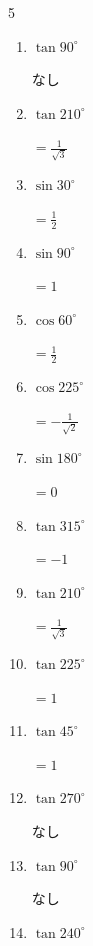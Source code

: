 \begin{multicols}{5}
\begin{enumerate}
  \item $\displaystyle \tan{90^\circ}$

        $\displaystyle なし$

  \item $\displaystyle \tan{210^\circ}$

        $\displaystyle =\frac{1}{\sqrt{3}}$

  \item $\displaystyle \sin{30^\circ}$

        $\displaystyle =\frac{1}{2}$

  \item $\displaystyle \sin{90^\circ}$

        $\displaystyle =1$

  \item $\displaystyle \cos{60^\circ}$

        $\displaystyle =\frac{1}{2}$

\columnbreak %

  \item $\displaystyle \cos{225^\circ}$

        $\displaystyle =-\frac{1}{\sqrt{2}}$

  \item $\displaystyle \sin{180^\circ}$

        $\displaystyle =0$

  \item $\displaystyle \tan{315^\circ}$

        $\displaystyle =-1$

  \item $\displaystyle \tan{210^\circ}$

        $\displaystyle =\frac{1}{\sqrt{3}}$

  \item $\displaystyle \tan{225^\circ}$

        $\displaystyle =1$

  \item $\displaystyle \tan{45^\circ}$

        $\displaystyle =1$

  \item $\displaystyle \tan{270^\circ}$

        $\displaystyle なし$

  \item $\displaystyle \tan{90^\circ}$

        $\displaystyle なし$

  \item $\displaystyle \tan{240^\circ}$


\end{enumerate}
\end{multicols}
